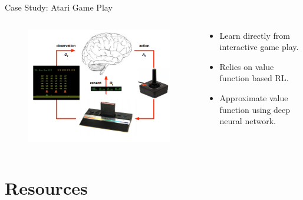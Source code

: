 \documentclass{beamer}
\begin{document}
\begin{frame}{Case Study: Atari Game Play}
    \begin{columns}
        \begin{column}{0.5\textwidth}
            \begin{figure}
                \centering
                \includegraphics[width=\textwidth]{images/atari_env}
            \end{figure}
        \end{column}
        
        \begin{column}{0.5\textwidth}
            \begin{itemize}
                \item Learn directly from interactive game play.
                \item Relies on value function based RL.
                \item Approximate value function using deep neural network.
            \end{itemize}
        \end{column}
    \end{columns}
    
\end{frame}

\section{Resources}
\end{document}
